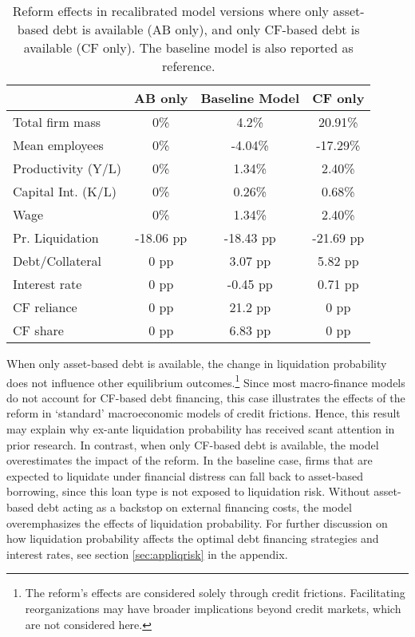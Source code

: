 \documentclass[12pt]{article}
\begin{document}
\begin{table}[H]
    \centering
    \begin{tabular}{lccc}
    & \textbf{AB only} & \textbf{Baseline Model} & \textbf{CF only} \\    
    \toprule
    Total firm mass & 0\% & 4.2\%  & 20.91\%  \\  
    Mean employees & 0\% & -4.04\%  & -17.29\%   \\  
    Productivity (Y/L) & 0\% & 1.34\%  & 2.40\%  \\  
    Capital Int. (K/L) & 0\% & 0.26\%  & 0.68\%  \\  
    Wage & 0\% & 1.34\%  & 2.40\%  \vspace{2mm}  \\  
    Pr. Liquidation & -18.06 pp & -18.43 pp  & -21.69 pp \\  
    Debt/Collateral & 0 pp & 3.07 pp  & 5.82 pp  \\  
    Interest rate & 0 pp & -0.45 pp  & 0.71 pp  \\  
    CF reliance & 0 pp & 21.2 pp  & 0 pp  \\    
    CF share & 0 pp & 6.83 pp  & 0 pp  \\  
    \bottomrule
    \end{tabular}
    \caption{\small Reform effects in recalibrated model versions where only asset-based debt is available (AB only), and only CF-based debt is available (CF only). The baseline model is also reported as reference.}
    \label{tab:percentage_changes}
\end{table}

\noindent When only asset-based debt is available, the change in liquidation probability does not influence other equilibrium outcomes.\footnote{The reform’s effects are considered solely through credit frictions. Facilitating reorganizations may have broader implications beyond credit markets, which are not considered here.} Since most macro-finance models do not account for CF-based debt financing, this case illustrates the effects of the reform in `standard' macroeconomic models of credit frictions. Hence, this result may explain why ex-ante liquidation probability has received scant attention in prior research. In contrast, when only CF-based debt is available, the model overestimates the impact of the reform. In the baseline case, firms that are expected to liquidate under financial distress can fall back to asset-based borrowing, since this loan type is not exposed to liquidation risk. Without asset-based debt acting as a backstop on external financing costs, the model overemphasizes the effects of liquidation probability. For further discussion on how liquidation probability affects the optimal debt financing strategies and interest rates, see section \ref{sec:appliqrisk} in the appendix. 
\end{document}
